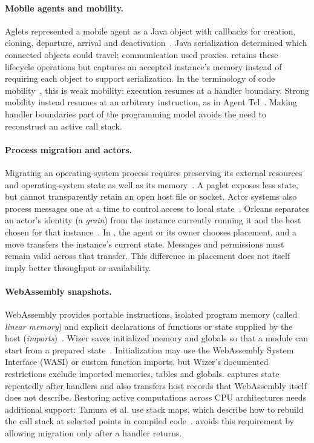 
\paragraph{Mobile agents and mobility.}
Aglets represented a mobile agent as a Java object with callbacks for
creation, cloning, departure, arrival and
deactivation~\cite{lange1997aglets,lange1998aglets}. Java serialization
determined which connected objects could travel; communication used
proxies. \paglets{} retains these lifecycle operations but captures an
accepted instance's memory instead of requiring each object to support
serialization. In the terminology of code
mobility~\cite{fuggetta1998mobility}, this is weak mobility: execution
resumes at a handler boundary. Strong mobility instead resumes at an
arbitrary instruction, as in Agent Tcl~\cite{gray1996agentTcl}.
Making handler boundaries part of the programming model avoids the need
to reconstruct an active call stack.

\paragraph{Process migration and actors.}
Migrating an operating-system process requires preserving its external
resources and operating-system state as well as its
memory~\cite{milojicic2000migration,criu}. A paglet exposes less state,
but cannot transparently retain an open host file or socket. Actor
systems also process messages one at a time to control access to local
state~\cite{hewitt1973actor,armstrong2003thesis}. Orleans separates an
actor's identity (a \emph{grain}) from the instance currently running it
and the host chosen for that instance~\cite{bernstein2014orleans}.
In \paglets{}, the agent or its owner chooses placement, and a move
transfers the instance's current state. Messages and permissions must
remain valid across that transfer. This difference in placement does
not itself imply better throughput or availability.

\paragraph{WebAssembly snapshots.}
WebAssembly provides portable instructions, isolated program memory
(called \emph{linear memory}) and explicit declarations of functions or
state supplied by the host (\emph{imports})~\cite{haas2017wasm}.
Wizer saves initialized memory and globals so that a module can start
from a prepared state~\cite{wizer}. Initialization may use the
WebAssembly System Interface (WASI) or custom function imports, but
Wizer's documented restrictions exclude imported memories, tables and
globals. \paglets{} captures state repeatedly after handlers and also
transfers host records that WebAssembly itself does not describe.
Restoring active computations across CPU architectures needs additional
support: Tamura et al. use stack maps, which describe how to rebuild
the call stack at selected points in compiled
code~\cite{tamura2025crossisa}. \paglets{} avoids this requirement by
allowing migration only after a handler returns.


